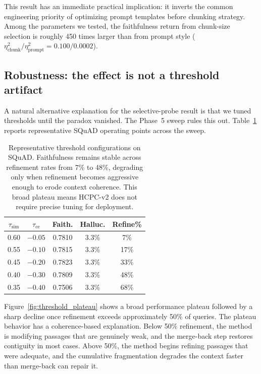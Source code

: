 This result has an immediate practical implication: it inverts the
common engineering priority of optimizing prompt templates before
chunking strategy. Among the parameters we tested, the faithfulness
return from chunk-size selection is roughly 450 times larger than from
prompt style
($\eta^2_{\text{chunk}} / \eta^2_{\text{prompt}} = 0.100 / 0.0002$).

\subsection{Robustness: the effect is not a threshold artifact}

A natural alternative explanation for the selective-probe result is that
we tuned thresholds until the paradox vanished. The Phase~5 sweep rules
this out. Table~\ref{tab:threshold} reports representative SQuAD
operating points across the sweep.

\begin{table}[!htb]
\centering
\caption{Representative threshold configurations on SQuAD. Faithfulness
remains stable across refinement rates from 7\% to 48\%, degrading only
when refinement becomes aggressive enough to erode context coherence. This
broad plateau means HCPC-v2 does not require precise tuning for deployment.}
\label{tab:threshold}
\small
\begin{tabular}{ccccc}
\toprule
$\tau_{\text{sim}}$ & $\tau_{\text{ce}}$ & Faith. & Halluc. & Refine\% \\
\midrule
0.60 & $-0.05$ & 0.7810 & 3.3\% & 7\%  \\
0.55 & $-0.10$ & 0.7815 & 3.3\% & 17\% \\
0.45 & $-0.20$ & 0.7823 & 3.3\% & 33\% \\
0.40 & $-0.30$ & 0.7809 & 3.3\% & 48\% \\
0.35 & $-0.40$ & 0.7506 & 3.3\% & 68\% \\
\bottomrule
\end{tabular}
\end{table}


Figure~\ref{fig:threshold_plateau} shows a broad performance plateau
followed by a sharp decline once refinement exceeds approximately 50\% of
queries. The plateau behavior has a coherence-based explanation. Below 50\%
refinement, the method is modifying passages that are genuinely weak, and
the merge-back step restores contiguity in most cases. Above 50\%, the
method begins refining passages that were adequate, and the cumulative
fragmentation degrades the context faster than merge-back can repair it.

